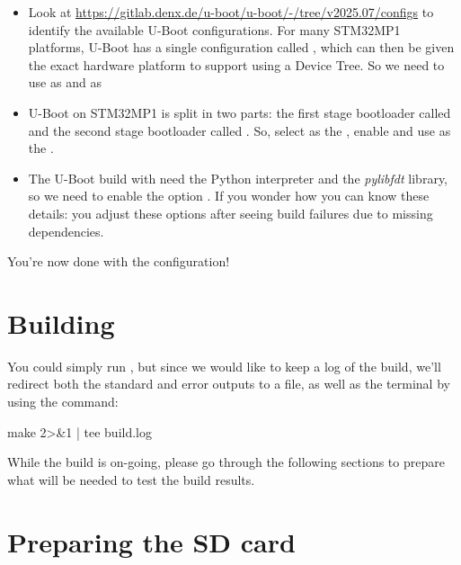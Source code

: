 \begin{itemize}
\begin{itemize}
  \item Look at
    \url{https://gitlab.denx.de/u-boot/u-boot/-/tree/v2025.07/configs}
    to identify the available U-Boot configurations. For many STM32MP1
    platforms, U-Boot has a single configuration called
    , which can then be given the exact
    hardware platform to support using a Device Tree. So we need to
    use  as  and
     as 

  \item U-Boot on STM32MP1 is split in two parts: the first stage
    bootloader called  and the second stage
    bootloader called . So, select 
    as the , enable  and use  as the
    .

  \item The U-Boot build with need the Python interpreter and the {\em
    pylibfdt} library, so we need to enable the option . If you wonder how you can know these details: you
    adjust these options after seeing build failures due to missing
    dependencies.

  \end{itemize}

\end{itemize}

You're now done with the configuration!

\section{Building}

You could simply run , but since we would like to keep a
log of the build, we'll redirect both the standard and error outputs
to a file, as well as the terminal by using the  command:

\begin{bashinput}
make 2>&1 | tee build.log
\end{bashinput}

While the build is on-going, please go through the following sections
to prepare what will be needed to test the build results.



\section{Preparing the SD card}

